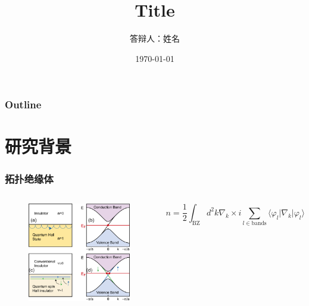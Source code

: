 \documentclass[10pt,aspectratio=169]{beamer} %
\title{Title}
\subtitle{}   %
\author[YuXuan Li]{答辩人：姓名}
\institute[South China Normal University]{\large 专业：凝聚态物理\\指导老师：某某\quad 教授}
\date{\today}
\begin{document}
\maketitle
\begin{frame}%
\frametitle{Outline}%
\textbf{\tableofcontents} %
\end{frame}
\section{研究背景}
\begin{frame}
\frametitle{拓扑绝缘体}
\begin{columns}
\begin{figure}[h]
\flushleft
\includegraphics[scale=0.4]{pic/fig1.png}
\end{figure}
\bigskip
{}
\begin{equation}	
	n=\frac{1}{2}\int_{\mathrm{BZ}}d^2k\nabla_k\times i\sum_{l\in\mathrm{bands}}\langle\varphi_l|\nabla_k|\varphi_l\rangle\label{chern_num}
\end{equation}
\end{columns}
\end{frame}
\end{document}
